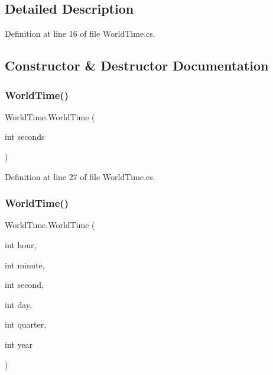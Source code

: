 \subsection{Detailed Description}


Definition at line 16 of file World\+Time.\+cs.



\subsection{Constructor \& Destructor Documentation}
\mbox{\label{struct_world_time_aeab5b857de135723065af7a79f4cde18}} 
\subsubsection{\texorpdfstring{World\+Time()}{WorldTime()}\hspace{0.1cm}{\footnotesize\ttfamily [1/3]}}
{\footnotesize\ttfamily World\+Time.\+World\+Time (\begin{DoxyParamCaption}\item[{int}]{seconds }\end{DoxyParamCaption})}



Definition at line 27 of file World\+Time.\+cs.

\mbox{\label{struct_world_time_a5eb3e286eab82748acbe202a9b8054db}} 
\subsubsection{\texorpdfstring{World\+Time()}{WorldTime()}\hspace{0.1cm}{\footnotesize\ttfamily [2/3]}}
{\footnotesize\ttfamily World\+Time.\+World\+Time (\begin{DoxyParamCaption}\item[{int}]{hour,  }\item[{int}]{minute,  }\item[{int}]{second,  }\item[{int}]{day,  }\item[{int}]{quarter,  }\item[{int}]{year }\end{DoxyParamCaption})}



